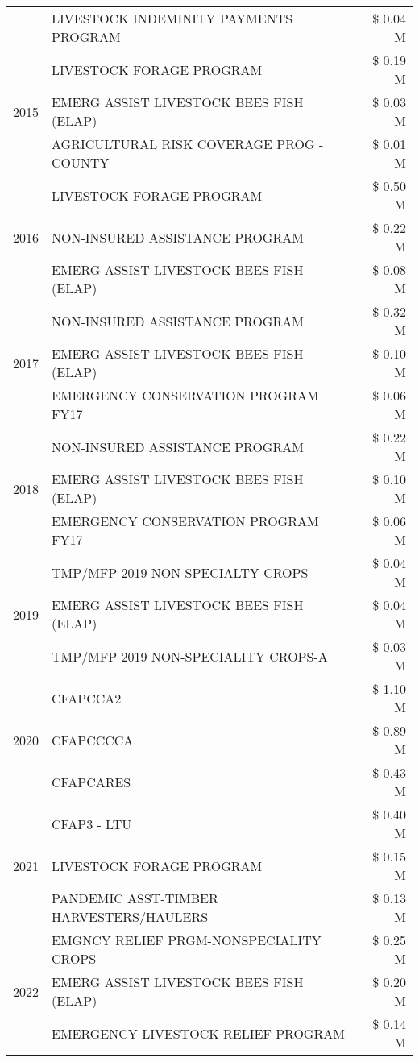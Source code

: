 \begin{tabular}{llr}
 & LIVESTOCK INDEMINITY PAYMENTS PROGRAM & \$ 0.04 M \\
\cline{1-3}
\multirow[t]{3}{*}{2015} & LIVESTOCK FORAGE PROGRAM & \$ 0.19 M \\
 & EMERG ASSIST LIVESTOCK BEES FISH (ELAP) & \$ 0.03 M \\
 & AGRICULTURAL RISK COVERAGE PROG - COUNTY & \$ 0.01 M \\
\cline{1-3}
\multirow[t]{3}{*}{2016} & LIVESTOCK FORAGE PROGRAM & \$ 0.50 M \\
 & NON-INSURED ASSISTANCE PROGRAM & \$ 0.22 M \\
 & EMERG ASSIST LIVESTOCK BEES FISH (ELAP) & \$ 0.08 M \\
\cline{1-3}
\multirow[t]{3}{*}{2017} & NON-INSURED ASSISTANCE PROGRAM & \$ 0.32 M \\
 & EMERG ASSIST LIVESTOCK BEES FISH (ELAP) & \$ 0.10 M \\
 & EMERGENCY CONSERVATION PROGRAM FY17 & \$ 0.06 M \\
\cline{1-3}
\multirow[t]{3}{*}{2018} & NON-INSURED ASSISTANCE PROGRAM & \$ 0.22 M \\
 & EMERG ASSIST LIVESTOCK BEES FISH (ELAP) & \$ 0.10 M \\
 & EMERGENCY CONSERVATION PROGRAM FY17 & \$ 0.06 M \\
\cline{1-3}
\multirow[t]{3}{*}{2019} & TMP/MFP 2019 NON SPECIALTY CROPS & \$ 0.04 M \\
 & EMERG ASSIST LIVESTOCK BEES FISH (ELAP) & \$ 0.04 M \\
 & TMP/MFP 2019 NON-SPECIALITY CROPS-A & \$ 0.03 M \\
\cline{1-3}
\multirow[t]{3}{*}{2020} & CFAPCCA2 & \$ 1.10 M \\
 & CFAPCCCCA & \$ 0.89 M \\
 & CFAPCARES & \$ 0.43 M \\
\cline{1-3}
\multirow[t]{3}{*}{2021} & CFAP3 - LTU & \$ 0.40 M \\
 & LIVESTOCK FORAGE PROGRAM & \$ 0.15 M \\
 & PANDEMIC ASST-TIMBER HARVESTERS/HAULERS & \$ 0.13 M \\
\cline{1-3}
\multirow[t]{3}{*}{2022} & EMGNCY RELIEF PRGM-NONSPECIALITY CROPS & \$ 0.25 M \\
 & EMERG ASSIST LIVESTOCK BEES FISH (ELAP) & \$ 0.20 M \\
 & EMERGENCY LIVESTOCK RELIEF PROGRAM & \$ 0.14 M \\
\cline{1-3}
\bottomrule
\end{tabular}
